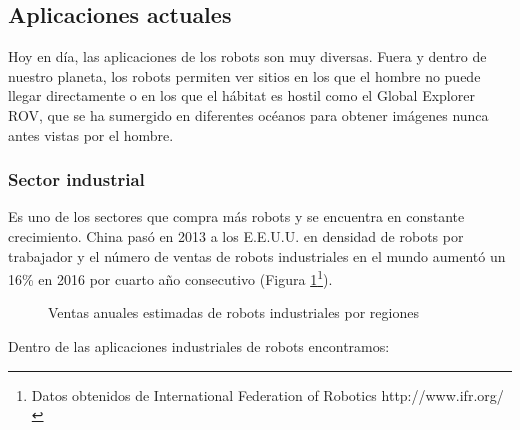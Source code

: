 \subsection{Aplicaciones actuales}\label{SEC:Aplic_actual}

Hoy en día, las aplicaciones de los robots son muy diversas. Fuera y dentro de nuestro planeta, los robots permiten ver sitios en los que el hombre no puede llegar directamente o en los que el hábitat es hostil como el Global Explorer ROV, que se ha sumergido en diferentes océanos para obtener imágenes nunca antes vistas por el hombre.

\subsubsection{Sector industrial}

Es uno de los sectores que compra más  robots y se encuentra en constante crecimiento. China pasó en 2013 a los E.E.U.U. en densidad de robots por trabajador y el número de ventas de robots industriales en el mundo aumentó un 16\%  en 2016 por cuarto año consecutivo (Figura \ref{FIG:_robotSales}\footnote{Datos obtenidos de International Federation of Robotics http://www.ifr.org/}\label{FN:IFR}). 

\begin{figure}[hbtp]
	\centering
	\caption{Ventas anuales estimadas de robots industriales por regiones}
	\label{FIG:_robotSales}
\end{figure}

Dentro de las aplicaciones industriales de robots encontramos:

